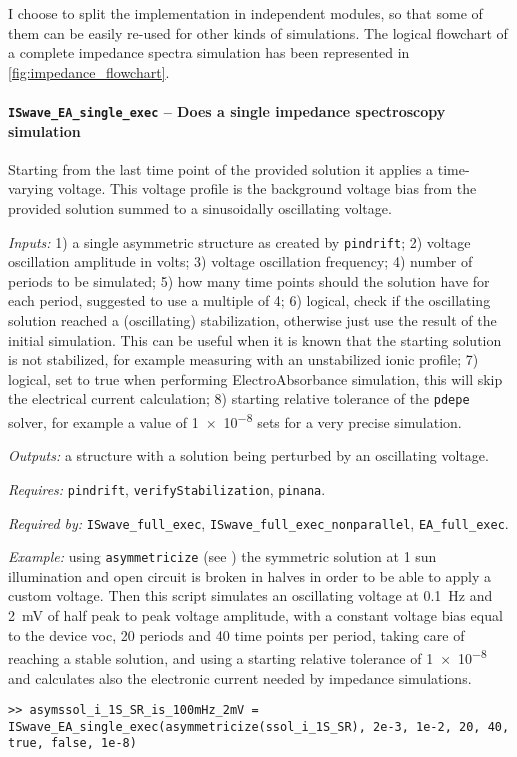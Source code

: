 	I choose to split the implementation in independent modules, so that some of them can be easily re-used for other kinds of simulations.
	The logical flowchart of a complete impedance spectra simulation has been represented in \cref{fig:impedance_flowchart}.


	\paragraph{\texttt{IS\-wave\_EA\_single\_exec} -- Does a single impedance spectroscopy simulation}
	Starting from the last time point of the provided solution it applies a time-varying voltage.
	This voltage profile is the background voltage bias from the provided solution summed to a sinusoidally oscillating voltage.

	\textit{Inputs:} 1) a single asymmetric structure as created by \texttt{pin\-drift};
	2) voltage oscillation amplitude in volts;
	3) voltage oscillation frequency;
	4) number of periods to be simulated;
	5) how many time points should the solution have for
	each period, suggested to use a multiple of 4;
	6) logical, check if the oscillating solution reached a
	(oscillating) stabilization, otherwise just use the result of the
	initial simulation. This can be useful when it is known that the
	starting solution is not stabilized, for example measuring with an
	unstabilized ionic profile;
	7) logical, set to true when performing ElectroAbsorbance simulation,
	this will skip the electrical current calculation;
	8) starting relative tolerance of the \texttt{pdepe} solver, for example a
	value of \num{1e-8} sets for a very precise simulation.

	\textit{Outputs:} a structure with a solution being perturbed by an
	oscillating voltage.

	\textit{Requires:} \texttt{pin\-drift}, \texttt{verify\-Stabilization}, \texttt{pinana}.

	\textit{Required by:} \texttt{IS\-wave\_full\_exec}, \texttt{IS\-wave\_full\_exec\_nonparallel}, \texttt{EA\_full\_exec}.

	\textit{Example:} using \texttt{asymmetricize} (see ) the symmetric solution at 1 sun illumination and open circuit is broken in halves in order to be able to apply a custom voltage.
	Then this script simulates an oscillating voltage at \SI{0.1}{\Hz} and \SI{2}{\mV} of half peak to peak voltage amplitude, with a constant voltage bias equal to the device \gls{voc},
	20 periods and 40 time points per period, taking care of reaching a stable solution,
	and using a starting relative tolerance of \num{1e-8} and calculates also the electronic current needed by impedance simulations.
	\begin{lstlisting}[style=Matlab-editor]
>> asymssol_i_1S_SR_is_100mHz_2mV = ISwave_EA_single_exec(asymmetricize(ssol_i_1S_SR), 2e-3, 1e-2, 20, 40, true, false, 1e-8)
   \end{lstlisting}

